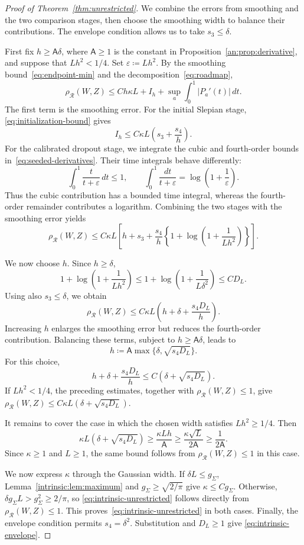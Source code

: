 \documentclass[11pt,letterpaper]{article}
\newenvironment{vSixBlock}{\color{magenta}}{}
\theoremstyle{remark}
\newcommand{\rh}{\rho_{\mathcal R}}
\begin{document}
\begin{vSixBlock}
\begin{proof}[Proof of Theorem~\ref{thm:unrestricted}]
We combine the errors from smoothing and the two comparison stages,
then choose the smoothing width to balance their contributions.
The envelope condition allows us to take \(s_3\le\delta\).

First fix \(h\ge\mathsf A\delta\), where \(\mathsf A\ge1\) is the
constant in Proposition~\ref{an:prop:derivative}, and suppose that
\(Lh^2<1/4\). Set \(\varepsilon\coloneqq Lh^2\). By the smoothing
bound~\eqref{eq:endpoint-min} and the decomposition~\eqref{eq:roadmap},
\[
 \rh(W,Z)
 \le Ch\kappa L+I_h+\sup_a\int_0^1|P_a'(t)|\,dt.
\]
The first term is the smoothing error. For the initial Slepian stage,
\eqref{eq:initialization-bound} gives
\[
 I_h\le C\kappa L\left(s_3+\frac{s_4}{h}\right).
\]
For the calibrated dropout stage, we integrate the cubic and
fourth-order bounds in~\eqref{eq:seeded-derivatives}. Their time
integrals behave differently:
\[
 \int_0^1\frac{t}{t+\varepsilon}\,dt\le1,
 \qquad
 \int_0^1\frac{dt}{t+\varepsilon}
 =\log\!\left(1+\frac1\varepsilon\right).
\]
Thus the cubic contribution has a bounded time integral, whereas the
fourth-order remainder contributes a logarithm. Combining the two
stages with the smoothing error yields
\[
 \rh(W,Z)\le C\kappa L\left[
 h+s_3+\frac{s_4}{h}
 \left\{1+\log\!\left(1+\frac1{Lh^2}\right)\right\}
 \right].
\]

We now choose \(h\). Since \(h\ge\delta\),
\[
 1+\log\!\left(1+\frac1{Lh^2}\right)
 \le1+\log\!\left(1+\frac1{L\delta^2}\right)
 \le CD_L.
\]
Using also \(s_3\le\delta\), we obtain
\[
 \rh(W,Z)\le C\kappa L
 \left(h+\delta+\frac{s_4D_L}{h}\right).
\]
Increasing \(h\) enlarges the smoothing error but reduces the
fourth-order contribution. Balancing these terms, subject to
\(h\ge\mathsf A\delta\), leads to
\[
 h\coloneqq\mathsf A\max\{\delta,\sqrt{s_4D_L}\}.
\]
For this choice,
\[
 h+\delta+\frac{s_4D_L}{h}
 \le C\left(\delta+\sqrt{s_4D_L}\right).
\]
If \(Lh^2<1/4\), the preceding estimates, together with
\(\rh(W,Z)\le1\), give \(\rh(W,Z)\le C\kappa L(\delta+\sqrt{s_4D_L})\).

It remains to cover the case in which the chosen width satisfies
\(Lh^2\ge1/4\). Then
\[
 \kappa L\left(\delta+\sqrt{s_4D_L}\right)
 \ge\frac{\kappa Lh}{\mathsf A}
 \ge\frac{\kappa\sqrt L}{2\mathsf A}
 \ge\frac1{2\mathsf A}.
\]
Since \(\kappa\ge1\) and \(L\ge1\), the same bound follows
from \(\rh(W,Z)\le1\) in this case.

We now express \(\kappa\) through the Gaussian width. If
\(\delta L\le g_\Sigma\), Lemma~\ref{intrinsic:lem:maximum} and
\(g_\Sigma\ge\sqrt{2/\pi}\) give \(\kappa\le Cg_\Sigma\).
Otherwise, \(\delta g_\Sigma L>g_\Sigma^2\ge2/\pi\), so
\eqref{eq:intrinsic-unrestricted} follows directly from
\(\rh(W,Z)\le1\). This proves~\eqref{eq:intrinsic-unrestricted}
in both cases. Finally, the envelope condition permits
\(s_4=\delta^2\). Substitution and \(D_L\ge1\) give
\eqref{eq:intrinsic-envelope}.
\end{proof}
\end{vSixBlock}
\end{document}
